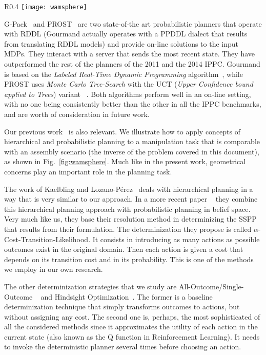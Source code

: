 \documentclass[../root.tex]{subfiles}
\begin{document}
\begin{wrapfigure}{R}{0.4\columnwidth}
	\centering
	\texttt{[image: wamsphere]}
	\caption{Barrett WAM robotic arm inserting a triangular piece through
		a cavity with the same shape}
	\label{fig:wamsphere}
\end{wrapfigure}

G-Pack~\cite{kolobov2012blrtdp} and PROST~\cite{keller2013atrial}
are two state-of-the art probabilistic
planners that operate with RDDL (Gourmand actually operates with a PPDDL dialect
that results from translating RDDL models) and provide on-line solutions to
the input MDPs. They interact with a server that sends the most recent state.
They have outperformed the rest of the planners of the 2011
and the 2014
IPPC. Gourmand is based on the \emph{Labeled Real-Time Dynamic Programming}
algorithm~\cite{bonet2003labeled}, while PROST uses \emph{Monte Carlo Tree-Search}
with the UCT (\emph{Upper Confidence bound applied to Trees}) variant%
~\cite{kocsis2006bandit}. Both
algorithms perform well in an on-line setting, with no one being consistently
better than the other in all the IPPC benchmarks, and are worth of consideration
in future work.

Our previous work~\cite{suarez2018interleaving} is
also relevant. We illustrate how to apply concepts of hierarchical and
probabilistic planning to a manipulation task that is comparable with an
assembly scenario (the inverse of the problem covered in this document),
as shown in Fig.~\ref{fig:wamsphere}. Much like in the present work,
geometrical concerns play an important role in the planning task.

The work of Kaelbling and Lozano-Pérez~%
\cite{kaelbling2011hierarchical} deals with hierarchical planning in
a way that is very similar to our approach. In a more recent paper%
~\cite{kaelbling2013integrated} they combine this hierarchical planning
approach with probabilistic planning in belief space. Very much like us,
they base their resolution method in determinizing the SSPP that results
from their formulation. The determinization they propose is called
$ \alpha $-Cost-Transition-Likelihood. It consists in introducing as many
actions as possible outcomes exist in the original domain. Then each
action is given a cost that depends on its transition cost and in its
probability. This is one of the methods we employ in our
own research.

The other determinization strategies that we study are All-Outcome/Single-Outcome%
~\cite{yoon2007ffreplan} and Hindsight Optimization~\cite{yoon2008probabilistic,yoon2010improving}.
The former is a baseline determinization technique that simply transforms outcomes
to actions, but without assigning any cost. The second one is, perhaps, the most
sophisticated of all the considered methods since it approximates the
utility of each action in the current state (also known as the Q function in
Reinforcement Learning). It needs to invoke the deterministic planner several times
before choosing an action.
\end{document}

